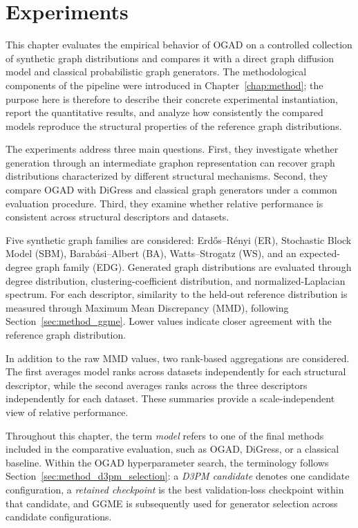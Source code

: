 \chapter{Experiments}
\label{chap:experiments}

This chapter evaluates the empirical behavior of OGAD on a controlled collection of synthetic graph distributions and compares it with a direct graph diffusion model and classical probabilistic graph generators. The methodological components of the pipeline were introduced in Chapter~\ref{chap:method}; the purpose here is therefore to describe their concrete experimental instantiation, report the quantitative results, and analyze how consistently the compared models reproduce the structural properties of the reference graph distributions.

The experiments address three main questions. First, they investigate whether generation through an intermediate graphon representation can recover graph distributions characterized by different structural mechanisms. Second, they compare OGAD with DiGress and classical graph generators under a common evaluation procedure. Third, they examine whether relative performance is consistent across structural descriptors and datasets.

Five synthetic graph families are considered: Erd\H{o}s--R\'enyi (ER), Stochastic Block Model (SBM), Barab\'asi--Albert (BA), Watts--Strogatz (WS), and an expected-degree graph family (EDG). Generated graph distributions are evaluated through degree distribution, clustering-coefficient distribution, and normalized-Laplacian spectrum. For each descriptor, similarity to the held-out reference distribution is measured through Maximum Mean Discrepancy (MMD), following Section~\ref{sec:method_ggme}. Lower values indicate closer agreement with the reference graph distribution.

In addition to the raw MMD values, two rank-based aggregations are considered. The first averages model ranks across datasets independently for each structural descriptor, while the second averages ranks across the three descriptors independently for each dataset. These summaries provide a scale-independent view of relative performance.

Throughout this chapter, the term \emph{model} refers to one of the final methods included in the comparative evaluation, such as OGAD, DiGress, or a classical baseline. Within the OGAD hyperparameter search, the terminology follows Section~\ref{sec:method_d3pm_selection}: a \emph{D3PM candidate} denotes one candidate configuration, a \emph{retained checkpoint} is the best validation-loss checkpoint within that candidate, and GGME is subsequently used for generator selection across candidate configurations.


